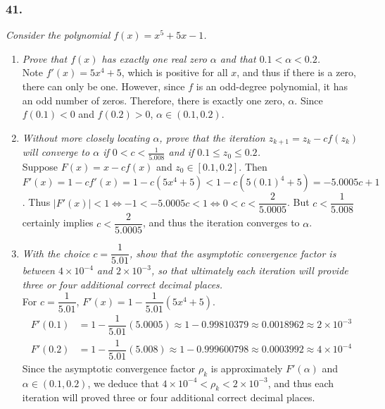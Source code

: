 \documentclass[12pt]{article}
\begin{document}
\subsubsection*{41.}
{\it Consider the polynomial $f(x) = x^5 + 5x - 1$.}
\begin{enumerate}[\it\ \ (a)\ \ ]
\item {\it Prove that $f(x)$ has exactly one real zero $\alpha$ and that $0.1 < \alpha < 0.2$.}\\

\noindent Note $f'(x) = 5x^4 + 5$, which is positive for all $x$, and thus if there is a zero, there can only be one.  However, since $f$ is an odd-degree polynomial, it has an odd number of zeros.  Therefore, there is exactly one zero, $\alpha$.  Since $f(0.1) < 0$ and $f(0.2) > 0$, $\alpha \in (0.1, 0.2)$.

\item {\it Without more closely locating $\alpha$, prove that the iteration $z_{k+1} = z_k - cf(z_k)$ will converge to $\alpha$ if $0 < c < \frac{1}{5.008}$ and if $0.1 \leq z_0 \leq 0.2$.}\\

\noindent Suppose $F(x) = x - cf(x)$ and $z_0 \in [0.1, 0.2]$.  Then $F'(x) = 1 - cf'(x) = 1 - c(5x^4 + 5) < 1 - c(5(0.1)^4 + 5) = -5.0005c + 1$.  Thus $|F'(x)| < 1 \iff -1 < -5.0005c < 1 \iff 0 < c < \dfrac{2}{5.0005}$.  But $c < \dfrac{1}{5.008}$ certainly implies $c < \dfrac{2}{5.0005}$, and thus the iteration converges to $\alpha$.

\item {\it With the choice $c = \dfrac{1}{5.01}$, show that the asymptotic convergence factor is between $4 \times 10^{-4}$ and $2 \times 10^{-3}$, so that ultimately each iteration will provide three or four additional correct decimal places.}\\

\noindent For $c = \dfrac{1}{5.01}$, $F'(x) = 1 - \dfrac{1}{5.01}(5x^4 + 5)$.
\begin{align*}
F'(0.1) &= 1 - \dfrac{1}{5.01}(5.0005) \approx 1 - 0.99810379 \approx 0.0018962 \approx 2 \times 10^{-3} \\
F'(0.2) &= 1 - \dfrac{1}{5.01}(5.008) \approx 1 - 0.999600798 \approx 0.0003992 \approx 4\times 10^{-4}
\end{align*}
Since the asymptotic convergence factor $\rho_k$ is approximately $F'(\alpha)$ and $\alpha \in (0.1, 0.2)$, we deduce that $4 \times 10^{-4} < \rho_k < 2 \times 10^{-3}$, and thus each iteration will proved three or four additional correct decimal places.


\end{enumerate}
\end{document}
